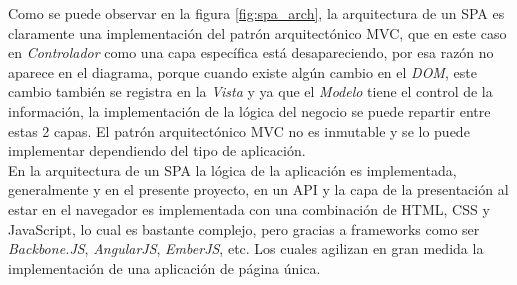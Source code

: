 Como se puede observar en la figura \ref{fig:spa_arch}, la arquitectura de un SPA es claramente  una implementación del patrón arquitectónico MVC, que en este caso en \emph{Controlador} como una capa específica está desapareciendo, por esa razón no aparece en el diagrama, porque cuando existe algún cambio en el \emph{DOM}, este cambio también se registra en la \emph{Vista} y ya que el \emph{Modelo} tiene el control de la información, la implementación de la lógica del negocio se puede repartir entre estas 2 capas. El patrón arquitectónico MVC no es inmutable y se lo puede implementar dependiendo del tipo de aplicación.\\



En la arquitectura de un SPA la lógica de la aplicación es implementada, generalmente y en el presente proyecto, en un API y la capa de la presentación al estar en el navegador es implementada con una combinación de HTML, CSS y JavaScript, lo cual es bastante complejo, pero gracias a frameworks como ser \emph{Backbone.JS}, \emph{AngularJS}, \emph{EmberJS}, etc. Los cuales agilizan en gran medida la implementación de una aplicación de página única.\\








%
%
%
%
%

